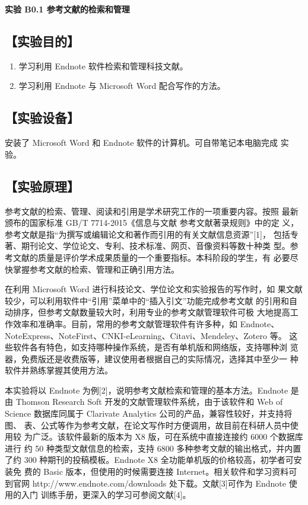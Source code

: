 \documentclass[12pt,a4paper,UTF8]{ctexart}
\begin{document}

\begin{center}
\LARGE\textbf{实验 B0.1 参考文献的检索和管理}
\end{center}





\subsection*{【实验目的】}
	\begin{enumerate}[(1)]
		\item 学习利用 Endnote 软件检索和管理科技文献。
		\item 学习利用 Endnote 与 Microsoft Word 配合写作的方法。
	\end{enumerate}

\subsection*{【实验设备】}
安装了 Microsoft Word 和 Endnote 软件的计算机。可自带笔记本电脑完成
实验。

\subsection*{【实验原理】}
参考文献的检索、管理、阅读和引用是学术研究工作的一项重要内容。按照
最新颁布的国家标准 GB/T 7714-2015《信息与文献 参考文献著录规则》中的定
义，参考文献是指“为撰写或编辑论文和著作而引用的有关文献信息资源”[1]，
包括专著、期刊论文、学位论文、专利、技术标准、网页、音像资料等数十种类
型。参考文献的质量是评价学术成果质量的一个重要指标。本科阶段的学生，有
必要尽快掌握参考文献的检索、管理和正确引用方法。

在利用 Microsoft Word 进行科技论文、学位论文和实验报告的写作时，如
果文献较少，可以利用软件中“引用”菜单中的“插入引文”功能完成参考文献
的引用和自动排序，但参考文献数量较大时，利用专业的参考文献管理软件可极
大地提高工作效率和准确率。目前，常用的参考文献管理软件有许多种，如
Endnote、NoteExpress、NoteFirst、CNKI-eLearning、Citavi、Mendeley、Zotero 等。
这些软件各有特色，如支持哪种操作系统，是否有单机版和网络版，支持哪种浏
览器，免费版还是收费版等，建议使用者根据自己的实际情况，选择其中至少一
种软件并熟练掌握其使用方法。

本实验将以 Endnote 为例[2]，说明参考文献检索和管理的基本方法。Endnote
是由 Thomson Research Soft 开发的文献管理软件系统，由于该软件和 Web of
Science 数据库同属于 Clarivate Analytics 公司的产品，兼容性较好，并支持将图、
表、公式等作为参考文献，在论文写作时方便调用，故目前在科研人员中使用较
为广泛。该软件最新的版本为 X8 版，可在系统中直接连接约 6000 个数据库进行
约 50 种类型文献信息的检索，支持 6800 多种参考文献的输出格式，并内置了约
300 种期刊的投稿模板。Endnote X8 全功能单机版的价格较高，初学者可安装免
费的 Basic 版本，但使用的时候需要连接 Internet。相关软件和学习资料可到官网
http://www.endnote.com/downloads 处下载。文献[3]可作为 Endnote 使用的入门
训练手册，更深入的学习可参阅文献[4]。
\end{document}
